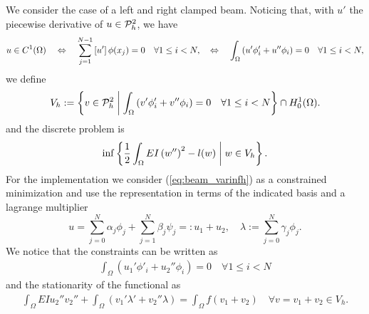 We consider the case of a left and right clamped beam. Noticing that, with $u'$ the piecewise derivative of $u\in \mathcal{P}^2_h$, we have
%
\begin{equation}\label{eq:beam_C1P2}
u\in C^1(\Omega) 
\quad\Leftrightarrow\quad \sum_{j=1}^{N-1} \left[u'\right]\phi(x_j)=0 \quad\forall 1\le i< N,
\quad\Leftrightarrow\quad \int_{\Omega} \left(u'\phi'_i + u''\phi_i\right)=0 \quad\forall 1\le i< N,
\end{equation}
%
we define
%
\begin{equation}\label{eq:beam_Vh}
V_h := \left\{v\in \mathcal{P}^2_h\;\middle|\;\int_{\Omega} \left(v'\phi'_i + v''\phi_i\right)=0 \quad\forall 1\le i< N\right\}\cap H^1_0(\Omega).
\end{equation}
%
and the discrete problem is
%
\begin{equation}\label{eq:beam_varinfh}
\inf\left\{\frac12\int_{\Omega}EI \left(w''\right)^2 - l(w)\;\middle|\;w\in V_h\right\}.
\end{equation}
%
For the implementation we consider (\ref{eq:beam_varinfh}) as a constrained minimization and use the representation in terms of the indicated basis and a lagrange multiplier
%
\begin{equation}\label{eq:}
u = \sum_{j=0}^N \alpha_j \phi_j +  \sum_{j=1}^N \beta_j \psi_j =: u_1 + u_2,\quad \lambda := \sum_{j=0}^N \gamma_j \phi_j.
\end{equation}
%
We notice that the constraints can be written as
%
\begin{align*}
\int_{\Omega} \left(u_1'\phi'_i + u_2''\phi_i\right)=0 \quad\forall 1\le i< N
\end{align*}
%
and the stationarity of the functional as
%
\begin{align*}
\int_{\Omega}EIu_2''v_2'' +  \int_{\Omega} \left(v_1'\lambda' + v_2''\lambda\right)=\int_{\Omega}f(v_1+v_2)\quad \forall v=v_1+v_2\in V_h.
\end{align*}
%


